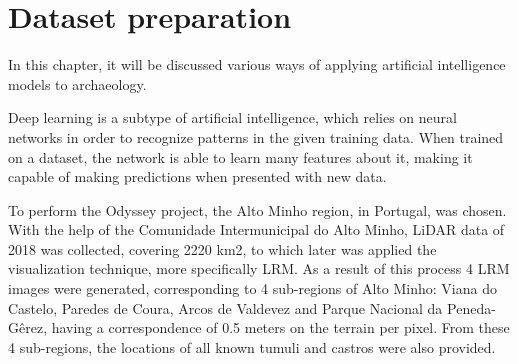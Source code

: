 
\chapter{Dataset preparation}

\begin{introduction}
In this chapter, it will be discussed various ways of applying artificial intelligence models to archaeology.
\end{introduction}





Deep learning is a subtype of artificial intelligence, which relies on neural networks in order to recognize patterns in the given training data. When trained on a dataset, the network is able to learn many features about it, making it capable of making predictions when presented with new data.



%
%

To perform the Odyssey project, the Alto Minho region, in Portugal, was chosen. With the help of the Comunidade Intermunicipal do Alto Minho\cite{comunidadeAltoMinho}, LiDAR data of 2018 was collected, covering 2220 km2, to which later was applied the visualization technique, more specifically LRM. As a result of this process 4 LRM images were generated, corresponding to 4 sub-regions of Alto Minho: Viana do Castelo, Paredes de Coura, Arcos de Valdevez and Parque Nacional da Peneda-Gêrez, having a correspondence of 0.5 meters on the terrain per pixel.
From these 4 sub-regions, the locations of all known tumuli and castros were also provided.

